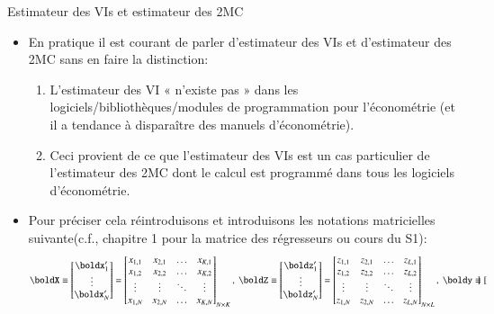 \begin{frame}[allowframebreaks]{Estimateur des VIs et estimateur des 2MC}
\begin{itemize}
\item En pratique il est courant de parler d'estimateur des VIs et d'estimateur des 2MC
sans en faire la distinction: 
\begin{enumerate}[$\star$]
   \item L’estimateur des VI « n’existe pas » dans les logiciels/bibliothèques/modules
   de programmation pour l’économétrie (et il a tendance à disparaître des manuels d’économétrie). 
   \item Ceci provient de ce que l’estimateur des VIs est un cas particulier 
   de l’estimateur des 2MC dont le calcul est programmé dans tous les logiciels d’économétrie.
\end{enumerate}
\item Pour préciser cela réintroduisons et introduisons les notations matricielles suivante(c.f.,
 chapitre 1 pour la matrice des régresseurs ou cours du S1):
\begin{align*}
    \boldX \equiv 
    \begin{bmatrix}
        \boldx_1^\prime\\
        \vdots\\
        \boldx_N^\prime
    \end{bmatrix}
    =
    \begin{bmatrix}
        x_{1, 1}&x_{2, 1}&\ldots&x_{K, 1}\\
        x_{1, 2}&x_{2, 2}&\ldots&x_{K, 2}\\
        \vdots&\vdots&\ddots&\vdots\\
        x_{1, N}&x_{2, N}&\ldots&x_{K, N}
    \end{bmatrix}_{N\times K}, \ 
    \boldZ \equiv 
    \begin{bmatrix}
        \boldz_1^\prime\\
        \vdots\\
        \boldz_N^\prime
    \end{bmatrix}
    =
    \begin{bmatrix}
        z_{1, 1}&z_{2, 1}&\ldots&z_{L, 1}\\
        z_{1, 2}&z_{2, 2}&\ldots&z_{L, 2}\\
        \vdots&\vdots&\ddots&\vdots\\
        z_{1, N}&z_{2, N}&\ldots&z_{L, N}
    \end{bmatrix}_{N\times L}, \ 
    \boldy \equiv
    \begin{bmatrix}

\end{bmatrix}
\end{align*}
\end{itemize}
\end{frame}
